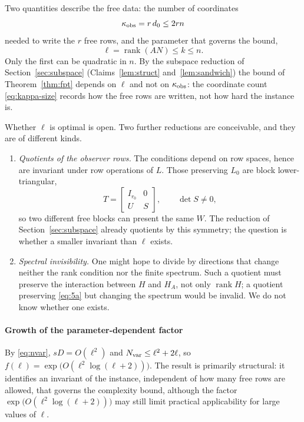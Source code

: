 \documentclass[journal]{IEEEtran}
\theoremstyle{plainn}
\theoremstyle{remark}
\begin{document}
\label{sec:paramsize}
Two quantities describe the free data: the number of coordinates
\begin{equation}\label{eq:kappa-size}
\kappa_{\rm obs}=r\,d_0\le2rn
\end{equation}
needed to write the $r$ free rows, and the parameter that governs the bound,
\begin{equation*}
\ell=\operatorname{rank}(AN)\le k\le n .
\end{equation*}
Only the first can be quadratic in $n$. By the subspace reduction of Section~\ref{sec:subspace}
(Claims~\ref{lem:struct} and~\ref{lem:sandwich}) the bound of Theorem~\ref{thm:fpt} depends on
$\ell$ and not on $\kappa_{\rm obs}$: the coordinate count \eqref{eq:kappa-size} records how the
free rows are written, not how hard the instance is.

Whether $\ell$ is optimal is open. Two further reductions are conceivable, and they are of
different kinds.

\begin{enumerate}
\item \emph{Quotients of the observer rows.} The conditions depend on row spaces, hence are
invariant under row operations of $L$. Those preserving $L_0$ are block lower-triangular,
\begin{equation*}
T=\begin{bmatrix}I_{r_0}&0\\ U&S\end{bmatrix},\qquad \det S\ne0 ,
\end{equation*}
so two different free blocks can present the same $W$. The reduction of
Section~\ref{sec:subspace} already quotients by this symmetry; the question is whether a
smaller invariant than $\ell$ exists.
\item \emph{Spectral invisibility.} One might hope to divide by directions that change neither
the rank condition nor the finite spectrum. Such a quotient must preserve the interaction
between $H$ and $H_A$, not only $\operatorname{rank}H$; a quotient preserving \eqref{eq:5a} but
changing the spectrum would be invalid. We do not know whether one exists.
\end{enumerate}

\paragraph*{Growth of the parameter-dependent factor}
By \eqref{eq:nvar}, $sD=O(\ell^2)$ and $N_{\rm var}\le\ell^2+2\ell$, so
$f(\ell)=\exp\bigl(O(\ell^2\log(\ell+2))\bigr)$. The result is primarily structural: it
identifies an invariant of the instance, independent of how many free rows are allowed, that
governs the complexity bound, although the factor $\exp\bigl(O(\ell^2\log(\ell+2))\bigr)$ may
still limit practical applicability for large values of $\ell$.
\end{document}
